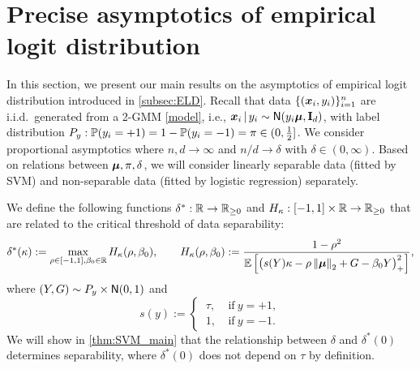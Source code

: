\section{Precise asymptotics of empirical logit distribution} \label{sec:logit}


In this section, we present our main results on the asymptotics of empirical logit distribution introduced in \cref{subsec:ELD}. Recall that data $\{(\xx_i, y_i)\}_{i = 1}^n$ are i.i.d.~generated from a 2-GMM \cref{model}, i.e., $\xx_i \,|\, y_i \sim \normal(y_i \bmu, \bI_d)$, with label distribution $P_y: \P(y_i = +1) = 1 - \P(y_i = -1) = \pi \in (0, \frac12]$. We consider proportional asymptotics where $n,d \to \infty$ and $n/d \to \delta$ with $\delta \in (0,\infty)$. Based on relations between $\bmu, \pi, \delta$, we will consider linearly separable data (fitted by SVM) and non-separable data (fitted by logistic regression) separately.

We define the following functions $\delta^*: \R \to \R_{\ge 0}$ and $H_\kappa: [-1, 1] \times \R \to \R_{\ge 0}$ that are related to the critical threshold of data separability:
\begin{equation}\label{eq:sep_functions}
     \delta^*(\kappa) := \max_{ \rho \in [-1, 1] , \beta_0 \in \R }  H_\kappa(\rho, \beta_0),
     \qquad
     H_\kappa(\rho, \beta_0) := \frac{1 - \rho^2}{\E\left[ \bigl(  s(Y) \kappa - \rho \norm{\bmu}_2 + G - \beta_0 Y \bigr)_+^2 \right]},
\end{equation}
where $(Y, G) \sim P_y \times \normal(0,1)$ and 
\begin{equation}\label{eq:s_fun}
     s(y) := \begin{cases} \ \tau , & \ \text{if} \ y = + 1, \\
        \ 1, & \ \text{if} \ y = -1. \end{cases}
\end{equation}
We will show in \cref{thm:SVM_main} that the relationship between $\delta$ and $\delta^*(0)$ determines separability, where $\delta^*(0)$ does not depend on $\tau$ by definition.

